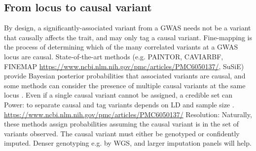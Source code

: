 \begin{outline}
%

\subsection{From locus to causal variant}

\1 By design, a significantly-associated variant from a \gls{GWAS} needs not be a variant that causally affects the trait, and may only tag a causal variant.
    \2 Fine-mapping is the process of determining which of the many correlated variants at a \gls{GWAS} locus are causal.
    \2 State-of-the-art methods (e.g. PAINTOR, CAVIARBF, FINEMAP \url{https://www.ncbi.nlm.nih.gov/pmc/articles/PMC6050137/}, SuSiE) provide Bayesian posterior probabilities that associated variants are causal, and some methods can consider the presence of multiple causal variants at the same locus \autocite{schaid2018GenomewideAssociationsCandidate}.
    \2 Even if a single causal variant cannot be assigned, a credible set can
    \2 Power: to separate causal and tag variants depends on \gls{LD} and sample size \autocite{visscher201710YearsGWAS}. \url{https://www.ncbi.nlm.nih.gov/pmc/articles/PMC6050137/}
    \2 Resolution: Naturally, these methods assign probabilities assuming the causal variant is in the set of variants observed.
    \2 The causal variant must either be genotyped or confidently imputed. Denser genotyping e.g. by WGS, and larger imputation panels will help.


\end{outline}
